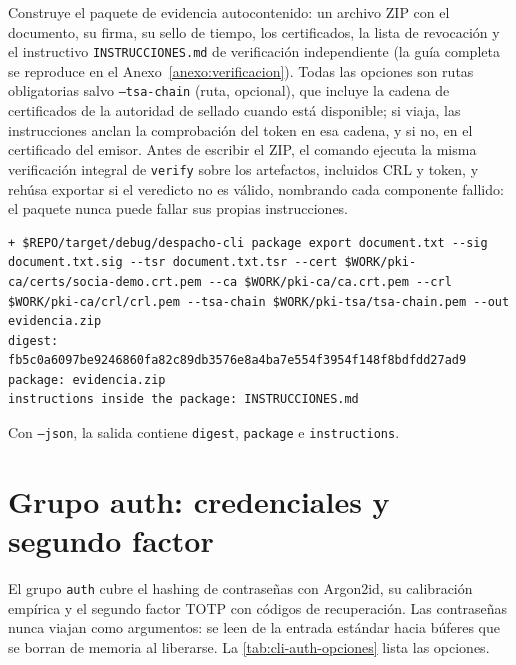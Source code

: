 Construye el paquete de evidencia autocontenido: un archivo ZIP con el documento, su firma, su sello de tiempo, los certificados, la lista de revocación y el instructivo \texttt{INSTRUCCIONES.md} de verificación independiente (la guía completa se reproduce en el Anexo~\ref{anexo:verificacion}). Todas las opciones son rutas obligatorias salvo \texttt{--tsa-chain} (ruta, opcional), que incluye la cadena de certificados de la autoridad de sellado cuando está disponible; si viaja, las instrucciones anclan la comprobación del token en esa cadena, y si no, en el certificado del emisor. Antes de escribir el ZIP, el comando ejecuta la misma verificación integral de \texttt{verify} sobre los artefactos, incluidos CRL y token, y rehúsa exportar si el veredicto no es válido, nombrando cada componente fallido: el paquete nunca puede fallar sus propias instrucciones.

\begin{lstlisting}[numbers=none]
+ $REPO/target/debug/despacho-cli package export document.txt --sig document.txt.sig --tsr document.txt.tsr --cert $WORK/pki-ca/certs/socia-demo.crt.pem --ca $WORK/pki-ca/ca.crt.pem --crl $WORK/pki-ca/crl/crl.pem --tsa-chain $WORK/pki-tsa/tsa-chain.pem --out evidencia.zip
digest:  fb5c0a6097be9246860fa82c89db3576e8a4ba7e554f3954f148f8bdfdd27ad9
package: evidencia.zip
instructions inside the package: INSTRUCCIONES.md
\end{lstlisting}

Con \texttt{--json}, la salida contiene \texttt{digest}, \texttt{package} e \texttt{instructions}.

\section{Grupo auth: credenciales y segundo factor}\label{sec:cli-auth}

El grupo \texttt{auth} cubre el hashing de contraseñas con Argon2id, su calibración empírica y el segundo factor TOTP con códigos de recuperación. Las contraseñas nunca viajan como argumentos: se leen de la entrada estándar hacia búferes que se borran de memoria al liberarse. La \cref{tab:cli-auth-opciones} lista las opciones.

